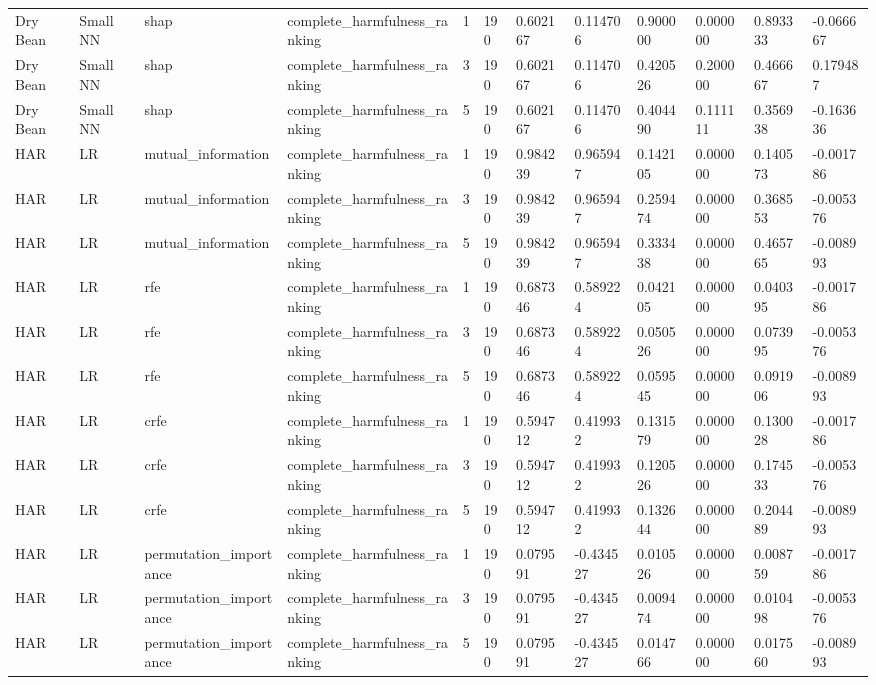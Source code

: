 \begin{table}[t]
\begin{tabular}{llllllllllll}
Dry Bean & Small NN & shap & complete\_harmfulness\_ranking & 1 & 190 & 0.602167 & 0.114706 & 0.900000 & 0.000000 & 0.893333 & -0.066667 \\
Dry Bean & Small NN & shap & complete\_harmfulness\_ranking & 3 & 190 & 0.602167 & 0.114706 & 0.420526 & 0.200000 & 0.466667 & 0.179487 \\
Dry Bean & Small NN & shap & complete\_harmfulness\_ranking & 5 & 190 & 0.602167 & 0.114706 & 0.404490 & 0.111111 & 0.356938 & -0.163636 \\
HAR & LR & mutual\_information & complete\_harmfulness\_ranking & 1 & 190 & 0.984239 & 0.965947 & 0.142105 & 0.000000 & 0.140573 & -0.001786 \\
HAR & LR & mutual\_information & complete\_harmfulness\_ranking & 3 & 190 & 0.984239 & 0.965947 & 0.259474 & 0.000000 & 0.368553 & -0.005376 \\
HAR & LR & mutual\_information & complete\_harmfulness\_ranking & 5 & 190 & 0.984239 & 0.965947 & 0.333438 & 0.000000 & 0.465765 & -0.008993 \\
HAR & LR & rfe & complete\_harmfulness\_ranking & 1 & 190 & 0.687346 & 0.589224 & 0.042105 & 0.000000 & 0.040395 & -0.001786 \\
HAR & LR & rfe & complete\_harmfulness\_ranking & 3 & 190 & 0.687346 & 0.589224 & 0.050526 & 0.000000 & 0.073995 & -0.005376 \\
HAR & LR & rfe & complete\_harmfulness\_ranking & 5 & 190 & 0.687346 & 0.589224 & 0.059545 & 0.000000 & 0.091906 & -0.008993 \\
HAR & LR & crfe & complete\_harmfulness\_ranking & 1 & 190 & 0.594712 & 0.419932 & 0.131579 & 0.000000 & 0.130028 & -0.001786 \\
HAR & LR & crfe & complete\_harmfulness\_ranking & 3 & 190 & 0.594712 & 0.419932 & 0.120526 & 0.000000 & 0.174533 & -0.005376 \\
HAR & LR & crfe & complete\_harmfulness\_ranking & 5 & 190 & 0.594712 & 0.419932 & 0.132644 & 0.000000 & 0.204489 & -0.008993 \\
HAR & LR & permutation\_importance & complete\_harmfulness\_ranking & 1 & 190 & 0.079591 & -0.434527 & 0.010526 & 0.000000 & 0.008759 & -0.001786 \\
HAR & LR & permutation\_importance & complete\_harmfulness\_ranking & 3 & 190 & 0.079591 & -0.434527 & 0.009474 & 0.000000 & 0.010498 & -0.005376 \\
HAR & LR & permutation\_importance & complete\_harmfulness\_ranking & 5 & 190 & 0.079591 & -0.434527 & 0.014766 & 0.000000 & 0.017560 & -0.008993 \\

\end{tabular}
\end{table}
